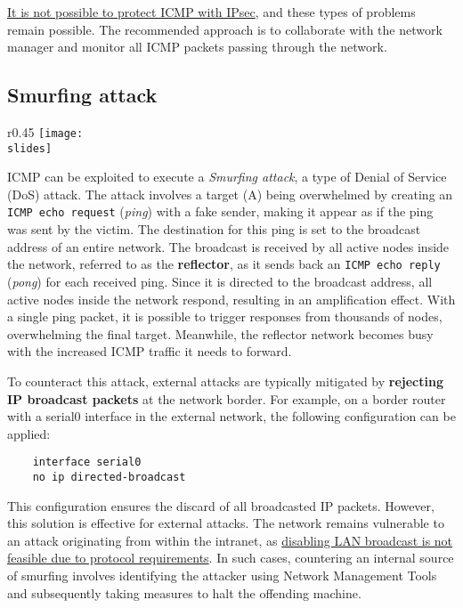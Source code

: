 \ul{It is not possible to protect ICMP with IPsec}, and these types of problems remain possible. The recommended approach is to collaborate with the network manager and monitor all ICMP packets passing through the network.

\subsection{Smurfing attack}
\begin{wrapfigure}{r}{0.45\textwidth}
    \centering
    \texttt{[image: \\slides]}
\end{wrapfigure}
ICMP can be exploited to execute a \textit{Smurfing attack}, a type of Denial of Service (DoS) attack.
The attack involves a target (A) being overwhelmed by creating an \texttt{ICMP echo request} (\textit{ping}) with a fake sender, making it appear as if the ping was sent by the victim. The destination for this ping is set to the broadcast address of an entire network. The broadcast is received by all active nodes inside the network, referred to as the \textbf{reflector}, as it sends back an \texttt{ICMP echo reply} (\textit{pong}) for each received ping. Since it is directed to the broadcast address, all active nodes inside the network respond, resulting in an amplification effect. With a single ping packet, it is possible to trigger responses from thousands of nodes, overwhelming the final target. Meanwhile, the reflector network becomes busy with the increased ICMP traffic it needs to forward.

To counteract this attack, external attacks are typically mitigated by \textbf{rejecting IP broadcast packets} at the network border. For example, on a border router with a serial0 interface in the external network, the following configuration can be applied:

\begin{verbatim}
    interface serial0
    no ip directed-broadcast    
\end{verbatim}

This configuration ensures the discard of all broadcasted IP packets. However, this solution is effective for external attacks. The network remains vulnerable to an attack originating from within the intranet, as \ul{disabling LAN broadcast is not feasible due to protocol requirements}. In such cases, countering an internal source of smurfing involves identifying the attacker using Network Management Tools and subsequently taking measures to halt the offending machine.


